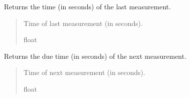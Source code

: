 \documentclass[letterpaper,10pt,english]{sphinxmanual}
\begin{document}
\begin{fulllineitems}
\begin{fulllineitems}
\begin{quote}
\begin{description}
\end{description}\end{quote}

\end{fulllineitems}


\begin{fulllineitems}
\label{\detokenize{modules/measurement/sensor:qnav.measurement.sensor.Sensor.last_update}}
\pysigstartsignatures
{}
\pysigstopsignatures
\sphinxAtStartPar
Returns the time (in seconds) of the last measurement.
\begin{quote}\begin{description}
\sphinxAtStartPar
Time of last measurement (in seconds).

\sphinxAtStartPar
float

\end{description}\end{quote}

\end{fulllineitems}


\begin{fulllineitems}
\label{\detokenize{modules/measurement/sensor:qnav.measurement.sensor.Sensor.next_update}}
\pysigstartsignatures
{}
\pysigstopsignatures
\sphinxAtStartPar
Returns the due time (in seconds) of the next measurement.
\begin{quote}\begin{description}
\sphinxAtStartPar
Time of next measurement (in seconds).

\sphinxAtStartPar
float

\end{description}\end{quote}

\end{fulllineitems}


\end{fulllineitems}
\end{document}
